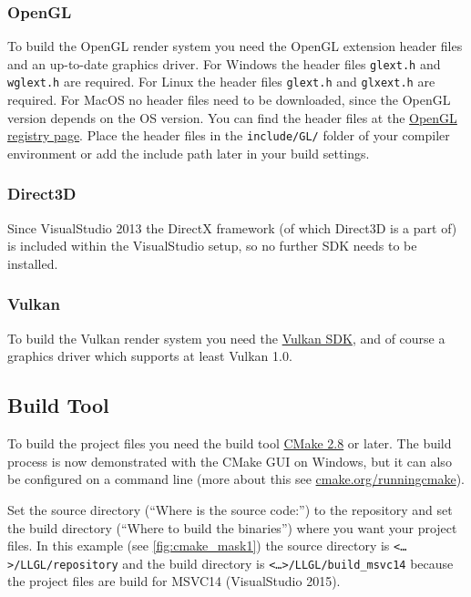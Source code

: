 \documentclass{article}
\begin{document}
\subsubsection*{OpenGL}

To build the OpenGL render system you need the OpenGL extension header files and an up-to-date graphics driver.
For Windows the header files \texttt{glext.h} and \texttt{wglext.h} are required.
For Linux the header files \texttt{glext.h} and \texttt{glxext.h} are required.
For MacOS no header files need to be downloaded, since the OpenGL version depends on the OS version.
You can find the header files at the \href{https://www.opengl.org/registry/#headers}{OpenGL registry page}.
Place the header files in the \texttt{include/GL/} folder of your compiler environment
or add the include path later in your build settings.

\subsubsection*{Direct3D}

Since VisualStudio 2013 the DirectX framework (of which Direct3D is a part of) is included within
the VisualStudio setup, so no further SDK needs to be installed.

\subsubsection*{Vulkan}

To build the Vulkan render system you need the \href{https://lunarg.com/vulkan-sdk/}{Vulkan SDK},
and of course a graphics driver which supports at least Vulkan 1.0.

\subsection*{Build Tool}

To build the \LLGL project files you need the build tool \href{https://cmake.org/}{CMake 2.8} or later.
The build process is now demonstrated with the CMake GUI on Windows, but it can also be configured
on a command line (more about this see \href{https://cmake.org/runningcmake/}{cmake.org/runningcmake}).

Set the source directory (``Where is the source code:'') to the \LLGL repository
and set the build directory (``Where to build the binaries'') where you want your project files.
In this example (see \ref{fig:cmake_mask1}) the source directory is \texttt{<\dots>/LLGL/repository}
and the build directory is \texttt{<\dots>/LLGL/build\_msvc14} because the project files are build
for MSVC14 (VisualStudio 2015).
\end{document}
